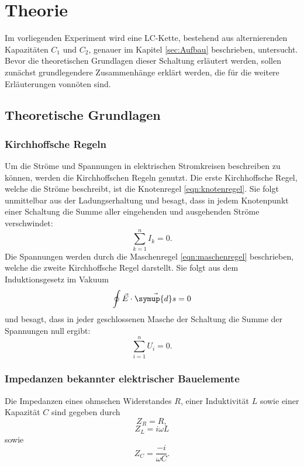 \section{Theorie}
Im vorliegenden Experiment wird eine LC-Kette, bestehend aus alternierenden Kapazitäten $C_1$ und $C_2$, genauer im Kapitel \ref{sec:Aufbau} beschrieben, untersucht.
Bevor die theoretischen Grundlagen dieser Schaltung erläutert werden, sollen zunächst grundlegendere Zusammenhänge erklärt werden, die für die weitere Erläuterungen vonnöten sind.
\label{sec:Theorie}
\subsection{Theoretische Grundlagen}
\subsubsection{Kirchhoffsche Regeln}
Um die Ströme und Spannungen in elektrischen Stromkreisen beschreiben zu können, werden die Kirchhoffschen Regeln genutzt.
Die erste Kirchhoffsche Regel, welche die Ströme beschreibt, ist die Knotenregel \eqref{eqn:knotenregel}.
Sie folgt unmittelbar aus der Ladungserhaltung und besagt, dass in jedem Knotenpunkt einer Schaltung die Summe aller eingehenden und ausgehenden Ströme verschwindet:
\begin{equation}
  \sum_{k=1}^n I_k = 0.
  \label{eqn:knotenregel}
\end{equation}
Die Spannungen werden durch die Maschenregel \eqref{eqn:maschenregel} beschrieben, welche die zweite Kirchhoffsche Regel darstellt.
Sie folgt aus dem Induktionsgesetz im Vakuum
\begin{equation}
\oint \vec{E} \cdot \vec{\symup{d}s} = 0
\end{equation}
und besagt, dass in jeder geschlossenen Masche der Schaltung die Summe der Spannungen null ergibt:
\begin{equation}
  \sum_{i=1}^n U_i = 0.
  \label{eqn:maschenregel}
\end{equation}
\subsubsection{Impedanzen bekannter elektrischer Bauelemente}
\label{sec:impedanzen}
Die Impedanzen eines ohmschen Widerstandes $R$, einer Induktivität $L$ sowie einer Kapazität $C$ sind gegeben durch
\begin{equation}
  Z_R = R,
\end{equation}
\begin{equation}
  Z_L = i \omega L
\end{equation}
sowie
\begin{equation}
  Z_C = \frac{-i}{\omega C}.
\end{equation}

